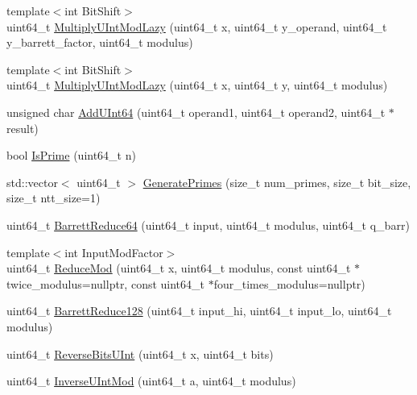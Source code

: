 \begin{DoxyCompactItemize}
\item 
{\footnotesize template$<$int Bit\-Shift$>$ }\\uint64\-\_\-t \hyperlink{namespaceintel_1_1hexl_1_1fpga_adbd0b0b7a9ac26e1dd6bb182998aedb1}{Multiply\-U\-Int\-Mod\-Lazy} (uint64\-\_\-t x, uint64\-\_\-t y\-\_\-operand, uint64\-\_\-t y\-\_\-barrett\-\_\-factor, uint64\-\_\-t modulus)
\item 
{\footnotesize template$<$int Bit\-Shift$>$ }\\uint64\-\_\-t \hyperlink{namespaceintel_1_1hexl_1_1fpga_a8ad6de5083fbeb063b3b9e697866d78e}{Multiply\-U\-Int\-Mod\-Lazy} (uint64\-\_\-t x, uint64\-\_\-t y, uint64\-\_\-t modulus)
\item 
unsigned char \hyperlink{namespaceintel_1_1hexl_1_1fpga_a28220ed548927fc4a21cc823e2e71f42}{Add\-U\-Int64} (uint64\-\_\-t operand1, uint64\-\_\-t operand2, uint64\-\_\-t $\ast$result)
\item 
bool \hyperlink{namespaceintel_1_1hexl_1_1fpga_a355c6cb8c5032602ed52e1c3789d8767}{Is\-Prime} (uint64\-\_\-t n)
\item 
std\-::vector$<$ uint64\-\_\-t $>$ \hyperlink{namespaceintel_1_1hexl_1_1fpga_a138dd08495620ae05b5576f1f9de1d22}{Generate\-Primes} (size\-\_\-t num\-\_\-primes, size\-\_\-t bit\-\_\-size, size\-\_\-t ntt\-\_\-size=1)
\item 
uint64\-\_\-t \hyperlink{namespaceintel_1_1hexl_1_1fpga_a5da697d6db585fa67212de6eb704e4ad}{Barrett\-Reduce64} (uint64\-\_\-t input, uint64\-\_\-t modulus, uint64\-\_\-t q\-\_\-barr)
\item 
{\footnotesize template$<$int Input\-Mod\-Factor$>$ }\\uint64\-\_\-t \hyperlink{namespaceintel_1_1hexl_1_1fpga_a8c1918497a3bd37a60af3098d5923814}{Reduce\-Mod} (uint64\-\_\-t x, uint64\-\_\-t modulus, const uint64\-\_\-t $\ast$twice\-\_\-modulus=nullptr, const uint64\-\_\-t $\ast$four\-\_\-times\-\_\-modulus=nullptr)
\item 
uint64\-\_\-t \hyperlink{namespaceintel_1_1hexl_1_1fpga_a6010de9857e16825343611c7b7f65f3f}{Barrett\-Reduce128} (uint64\-\_\-t input\-\_\-hi, uint64\-\_\-t input\-\_\-lo, uint64\-\_\-t modulus)
\item 
uint64\-\_\-t \hyperlink{namespaceintel_1_1hexl_1_1fpga_ac7d25ff5107f521d5a1e9365bf0eeb0b}{Reverse\-Bits\-U\-Int} (uint64\-\_\-t x, uint64\-\_\-t bits)
\item 
uint64\-\_\-t \hyperlink{namespaceintel_1_1hexl_1_1fpga_a845482aca85af5a78444389a52c61271}{Inverse\-U\-Int\-Mod} (uint64\-\_\-t a, uint64\-\_\-t modulus)

\end{DoxyCompactItemize}
